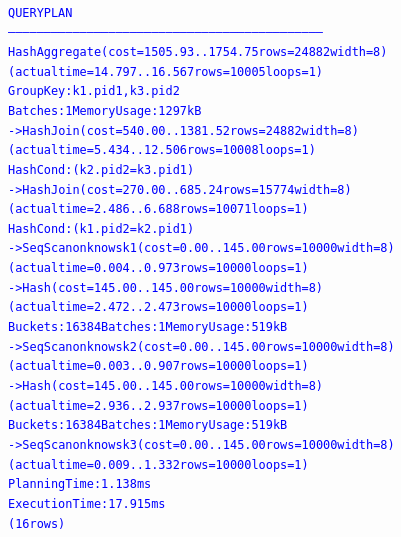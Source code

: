 \documentclass{article}
\begin{document}
    \begin{center}
      {\tiny
      \begin{alltt}
      \textcolor{blue}{
        QUERY PLAN                                                             
        ------------------------------------------------------------------------------------------------------------------------------------
         HashAggregate  (cost=1505.93..1754.75 rows=24882 width=8) (actual time=14.797..16.567 rows=10005 loops=1)
           Group Key: k1.pid1, k3.pid2
           Batches: 1  Memory Usage: 1297kB
           ->  Hash Join  (cost=540.00..1381.52 rows=24882 width=8) (actual time=5.434..12.506 rows=10008 loops=1)
                 Hash Cond: (k2.pid2 = k3.pid1)
                 ->  Hash Join  (cost=270.00..685.24 rows=15774 width=8) (actual time=2.486..6.688 rows=10071 loops=1)
                       Hash Cond: (k1.pid2 = k2.pid1)
                       ->  Seq Scan on knows k1  (cost=0.00..145.00 rows=10000 width=8) (actual time=0.004..0.973 rows=10000 loops=1)
                       ->  Hash  (cost=145.00..145.00 rows=10000 width=8) (actual time=2.472..2.473 rows=10000 loops=1)
                             Buckets: 16384  Batches: 1  Memory Usage: 519kB
                             ->  Seq Scan on knows k2  (cost=0.00..145.00 rows=10000 width=8) (actual time=0.003..0.907 rows=10000 loops=1)
                 ->  Hash  (cost=145.00..145.00 rows=10000 width=8) (actual time=2.936..2.937 rows=10000 loops=1)
                       Buckets: 16384  Batches: 1  Memory Usage: 519kB
                       ->  Seq Scan on knows k3  (cost=0.00..145.00 rows=10000 width=8) (actual time=0.009..1.332 rows=10000 loops=1)
         Planning Time: 1.138 ms
         Execution Time: 17.915 ms
        (16 rows)
       }
      \end{alltt}
      }
    \end{center}
\end{document}
